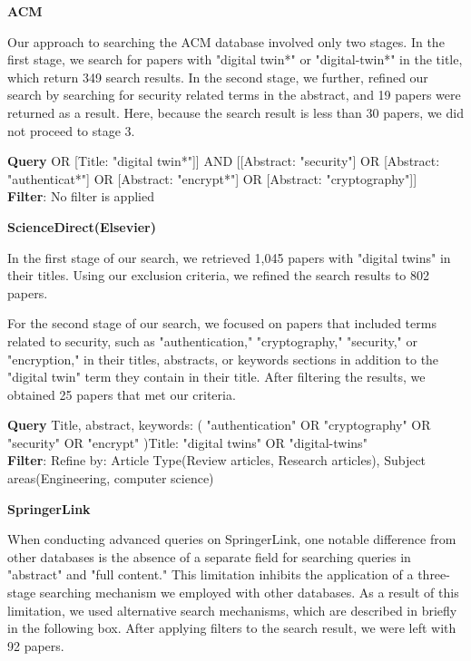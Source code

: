 \textbf{ACM}

Our approach to searching the ACM database involved only two stages. In the first stage, we search for papers with "digital twin*" or "digital-twin*" in the title, which return 349 search results. In the second stage, we further, refined our search by searching for security related terms in the abstract, and 19 papers were returned as a result. Here, because the search result is less than 30 papers, we did not proceed to stage 3.

\begin{tcolorbox}[colback=black!5!white, sharp corners=all, colframe=white!95!black]
\textbf{Query}
\tcblower
[[Title: "digital-twin*"] OR [Title: "digital twin*"]] AND [[Abstract: "security"] OR [Abstract: "authenticat*"] OR [Abstract: "encrypt*"] OR [Abstract: "cryptography"]]\\

\textbf{Filter}: No filter is applied

\end{tcolorbox}


\textbf{ScienceDirect(Elsevier)}

In the first stage of our search, we retrieved 1,045 papers with "digital twins" in their titles. Using our exclusion criteria, we refined the search results to 802 papers.

For the second stage of our search, we focused on papers that included terms related to security, such as "authentication," "cryptography," "security," or "encryption," in their titles, abstracts, or keywords sections in addition to the "digital twin" term they contain in their title. After filtering the results, we obtained 25 papers that met our criteria.


\begin{tcolorbox}[colback=black!5!white, sharp corners=all, colframe=white!95!black]
\textbf{Query}
\tcblower
Title, abstract, keywords: ( "authentication" OR "cryptography" OR "security" OR "encrypt" )Title: "digital twins" OR "digital-twins"\\

\textbf{Filter}: Refine by: Article Type(Review articles, Research articles), Subject areas(Engineering, computer science) 

\end{tcolorbox}


\textbf{SpringerLink}

When conducting advanced queries on SpringerLink, one notable difference from other databases is the absence of a separate field for searching queries in "abstract" and "full content." This limitation inhibits the application of a three-stage searching mechanism we employed with other databases. 
As a result of this limitation, we used alternative search mechanisms, which are described in briefly in the following box. After applying filters to the search result, we were left with 92 papers. 

